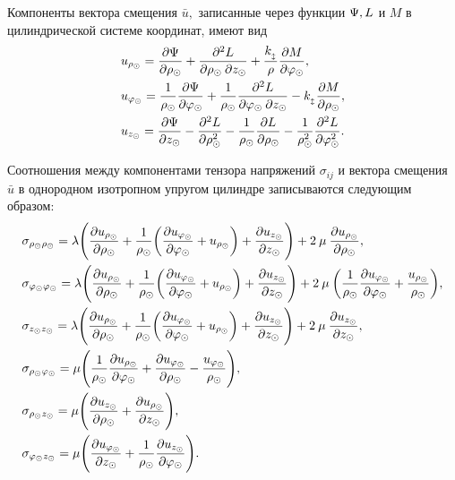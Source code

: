 Компоненты вектора смещения $\bar{u},$ записанные через функции $\P, L$ и $M$ в цилиндрической системе координат, имеют вид
\begin{align}\label{u_cherez_L_M}
&u_{\r\cyl}=\frac{\partial \P}{\partial\r\cyl}+\frac{\partial^2 L}{\partial\r\cyl\:\partial z\cyl}+\frac{k_{\popr}}{\r}\frac{\partial M}{\partial \f\cyl},\\
&u_{\f\cyl}=\frac{1}{\r\cyl}\frac{\partial \P}{\partial \f\cyl}+\frac{1}{\r\cyl}\frac{\partial^{2} L}{\partial\f\cyl\: \partial z\cyl}-k_{\popr}\frac{\partial M}{\partial \r\cyl},\\
&u_{z\cyl}=\frac{\partial\P}{\partial z\cyl}-\frac{\partial^{2} L}{\partial \r^2\cyl}-\frac{1}{\r\cyl}\frac{\partial L}{\partial \r\cyl}-\frac{1}{\r^2\cyl}\frac{\partial^2L}{\partial\f^2\cyl}.
\end{align}

Соотношения между компонентами тензора напряжений $\sigma_{ij}$ и вектора смещения $\bar{u}$ в однородном изотропном упругом цилиндре записываются следующим образом:
\begin{equation}\label{tenzor_napr}
\begin{aligned}
&\sigma_{\r\cyl\r\cyl}=\lambda\Biggl(\frac{\partial u_{\r\cyl}}{\partial \r\cyl}+\frac{1}{\r\cyl}\biggl(\frac{\partial u_{\f\cyl}}{\partial\f\cyl}+u_{\r\cyl}\biggr)+\frac{\partial u_{z\cyl}}{\partial z\cyl}\Biggr)+2\:\mu\:\frac{\partial u_{\r\cyl}}{\partial \r\cyl},\\
&\sigma_{\f\cyl\f\cyl}=\lambda\Biggl(\frac{\partial u_{\r\cyl}}{\partial \r\cyl}+\frac{1}{\r\cyl}\biggl(\frac{\partial u_{\f\cyl}}{\partial\f\cyl}+u_{\r\cyl}\biggr)+\frac{\partial u_{z\cyl}}{\partial z\cyl}\Biggr)+2\:\mu\:\biggl(\frac{1}{\r\cyl}\frac{\partial u_{\f\cyl}}{\partial\f\cyl}+\frac{u_{\r\cyl}}{\r\cyl}\biggr),\\
&\sigma_{z\cyl z\cyl}=\lambda\Biggl(\frac{\partial u_{\r\cyl}}{\partial \r\cyl}+\frac{1}{\r\cyl}\biggl(\frac{\partial u_{\f\cyl}}{\partial\f\cyl}+u_{\r\cyl}\biggr)+\frac{\partial u_{z\cyl}}{\partial z\cyl}\Biggr)+2\:\mu\:\frac{\partial u_{z\cyl}}{\partial z\cyl},\\
&\sigma_{\r\cyl\f\cyl}=\mu\Biggl(\frac{1}{\r\cyl}\frac{\partial u_{\r\cyl}}{\partial\f\cyl}+\frac{\partial u_{\f\cyl}}{\partial \r\cyl}-\frac{u_{\f\cyl}}{\r\cyl}\Biggr),\\
&\sigma_{\r\cyl z\cyl}=\mu\Biggl(\frac{\partial u_{z\cyl}}{\partial \r\cyl}+\frac{\partial u_{\r\cyl}}{\partial z\cyl}\Biggr),\\
&\sigma_{\f\cyl z\cyl}=\mu\Biggl(\frac{\partial u_{\f\cyl}}{\partial z\cyl}+\frac{1}{\r\cyl}\frac{\partial u_{z\cyl}}{\partial \f\cyl}\Biggr).
\end{aligned}
\end{equation}

